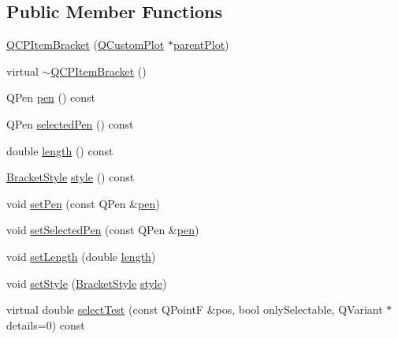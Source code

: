 \subsection*{Public Member Functions}
\begin{DoxyCompactItemize}
\item 
\hyperlink{classQCPItemBracket_a44ecfa37a76de5e3549e2d61f9d8ee56}{Q\+C\+P\+Item\+Bracket} (\hyperlink{classQCustomPlot}{Q\+Custom\+Plot} $\ast$\hyperlink{classQCPLayerable_ab7e0e94461566093d36ffc0f5312b109}{parent\+Plot})
\item 
virtual \hyperlink{classQCPItemBracket_ad773c3e8e09868d6f8caeb92c54919f4}{$\sim$\+Q\+C\+P\+Item\+Bracket} ()
\item 
Q\+Pen \hyperlink{classQCPItemBracket_a8963ff4a232b649c83d2461fd3c30d39}{pen} () const 
\item 
Q\+Pen \hyperlink{classQCPItemBracket_a9f6ea5ea9559ef36dfacdadd6e9bdcf0}{selected\+Pen} () const 
\item 
double \hyperlink{classQCPItemBracket_aed5126eafcb1381ee5718499c20ba023}{length} () const 
\item 
\hyperlink{classQCPItemBracket_a7ac3afd0b24a607054e7212047d59dbd}{Bracket\+Style} \hyperlink{classQCPItemBracket_afad726f453f70fe77c0e9c2f260fff97}{style} () const 
\item 
void \hyperlink{classQCPItemBracket_ab13001d9cc5d8f9e56ea15bdda682acb}{set\+Pen} (const Q\+Pen \&\hyperlink{classQCPItemBracket_a8963ff4a232b649c83d2461fd3c30d39}{pen})
\item 
void \hyperlink{classQCPItemBracket_a349785c31122778a520c64891fa204c5}{set\+Selected\+Pen} (const Q\+Pen \&\hyperlink{classQCPItemBracket_a8963ff4a232b649c83d2461fd3c30d39}{pen})
\item 
void \hyperlink{classQCPItemBracket_ac7cfc3da7da9b5c5ac5dfbe4f0351b2a}{set\+Length} (double \hyperlink{classQCPItemBracket_aed5126eafcb1381ee5718499c20ba023}{length})
\item 
void \hyperlink{classQCPItemBracket_a612dffa2373422eef8754d690add3703}{set\+Style} (\hyperlink{classQCPItemBracket_a7ac3afd0b24a607054e7212047d59dbd}{Bracket\+Style} \hyperlink{classQCPItemBracket_afad726f453f70fe77c0e9c2f260fff97}{style})
\item 
virtual double \hyperlink{classQCPItemBracket_aa6933caff1d42c54bcebc769ef88c798}{select\+Test} (const Q\+PointF \&pos, bool only\+Selectable, Q\+Variant $\ast$details=0) const 
\end{DoxyCompactItemize}
